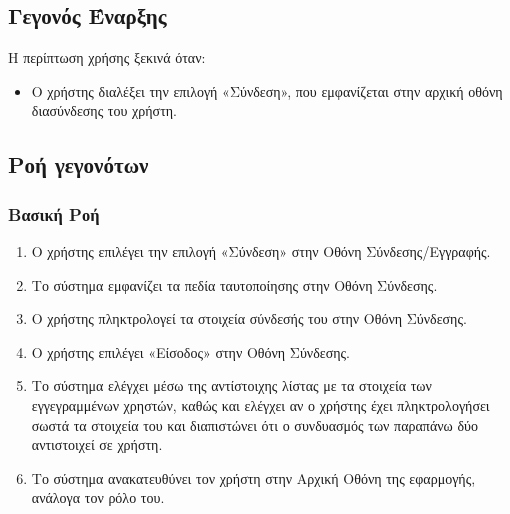 \documentclass[12pt,a4paper,twoside]{book}
\begin{document}
\subsection{Γεγονός Έναρξης}
Η περίπτωση χρήσης ξεκινά όταν:
\begin{itemize}
  \item Ο χρήστης διαλέξει την επιλογή «Σύνδεση», που εμφανίζεται στην αρχική οθόνη διασύνδεσης του χρήστη. %
\end{itemize}

\subsection{Ροή γεγονότων}

\subsubsection{Βασική Ροή}
\begin{enumerate}
  \item Ο χρήστης επιλέγει την επιλογή «Σύνδεση» στην Οθόνη Σύνδεσης/Εγγραφής. %
  \item Το σύστημα εμφανίζει τα πεδία ταυτοποίησης στην Οθόνη Σύνδεσης. %
  \item Ο χρήστης πληκτρολογεί τα στοιχεία σύνδεσής του στην Οθόνη Σύνδεσης. %
  \item Ο χρήστης επιλέγει «Είσοδος» στην Οθόνη Σύνδεσης. %
  \item Το σύστημα ελέγχει μέσω της αντίστοιχης λίστας με τα στοιχεία των εγγεγραμμένων χρηστών, καθώς και ελέγχει αν ο χρήστης έχει πληκτρολογήσει σωστά τα στοιχεία του και διαπιστώνει ότι ο συνδυασμός των παραπάνω δύο αντιστοιχεί σε χρήστη. %
  \item Το σύστημα ανακατευθύνει τον χρήστη στην Αρχική Οθόνη της εφαρμογής, ανάλογα τον ρόλο του. %
\end{enumerate}
\end{document}
